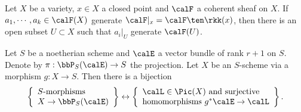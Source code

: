     \begin{proposition}\label{prop: geometric form of Nakayama's lemma}
        Let \(X\) be a variety, $x\in X$ a closed point and $\calF$ a coherent sheaf on $X$.
        If $a_1,\cdots,a_k \in \calF(X)$ generate $\calF|_x = \calF \ten \rkk(x)$, then there is an open subset $U \subset X$ such that $a_i|_U$ generate $\calF(U)$. 
    \end{proposition}

    \begin{proposition}\label{prop:relative_morphism_to_projective_bundle}
        Let \(S\) be a noetherian scheme and \(\calE\) a vector bundle of rank \(r+1\) on \(S\).
        Denote by \(\pi: \bbP_S(\calE) \to S\) the projection.
        Let \(X\) be an \(S\)-scheme via a morphism \(g:X \to S\).
        Then there is a bijection
        \[
            \left\{\begin{array}{l}
                S\text{-morphisms }\\
                X \to \bbP_S(\calE)
            \end{array}\right\}
            \leftrightarrow
            \left\{
                \begin{array}{l}
                    \calL \in \Pic(X) \text{ and surjective}\\
                    \text{homomorphisms } g^*\calE \to \calL
                \end{array}
            \right\}.
        \]
    \end{proposition}
